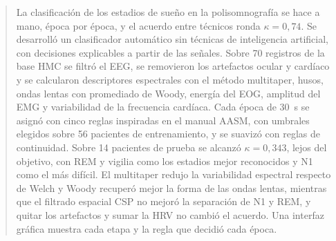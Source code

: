 \documentclass[11pt,a4paper]{article}
\begin{document}


\begin{abstract}
La clasificación de los estadios de sueño en la polisomnografía se hace a mano, época por época, y el acuerdo entre técnicos ronda $\kappa = 0{,}74$. Se desarrolló un clasificador automático sin técnicas de inteligencia artificial, con decisiones explicables a partir de las señales. Sobre 70 registros de la base HMC se filtró el EEG, se removieron los artefactos ocular y cardíaco y se calcularon descriptores espectrales con el método multitaper, husos, ondas lentas con promediado de Woody, energía del EOG, amplitud del EMG y variabilidad de la frecuencia cardíaca. Cada época de 30~s se asignó con cinco reglas inspiradas en el manual AASM, con umbrales elegidos sobre 56 pacientes de entrenamiento, y se suavizó con reglas de continuidad. Sobre 14 pacientes de prueba se alcanzó $\kappa = 0{,}343$, lejos del objetivo, con REM y vigilia como los estadios mejor reconocidos y N1 como el más difícil. El multitaper redujo la variabilidad espectral respecto de Welch y Woody recuperó mejor la forma de las ondas lentas, mientras que el filtrado espacial CSP no mejoró la separación de N1 y REM, y quitar los artefactos y sumar la HRV no cambió el acuerdo. Una interfaz gráfica muestra cada etapa y la regla que decidió cada época.
\end{abstract}







\printbibliography


\end{document}
